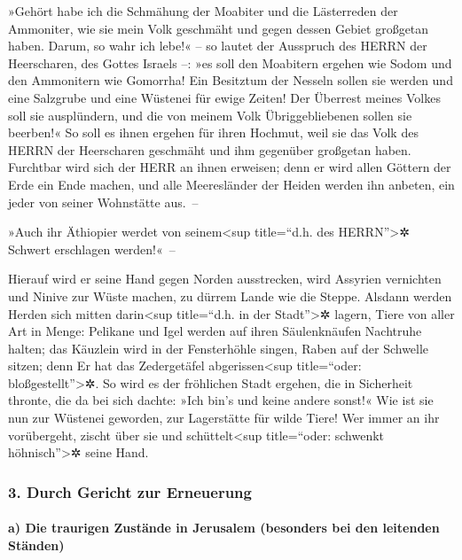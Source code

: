  »Gehört habe ich die Schmähung der Moabiter und die
Lästerreden der Ammoniter, wie sie mein Volk geschmäht und gegen dessen
Gebiet großgetan haben.  Darum, so wahr ich lebe!« -- so
lautet der Ausspruch des HERRN der Heerscharen, des Gottes Israels --:
»es soll den Moabitern ergehen wie Sodom und den Ammonitern wie
Gomorrha! Ein Besitztum der Nesseln sollen sie werden und eine Salzgrube
und eine Wüstenei für ewige Zeiten! Der Überrest meines Volkes soll sie
ausplündern, und die von meinem Volk Übriggebliebenen sollen sie
beerben!«  So soll es ihnen ergehen für ihren Hochmut,
weil sie das Volk des HERRN der Heerscharen geschmäht und ihm gegenüber
großgetan haben.  Furchtbar wird sich der HERR an ihnen
erweisen; denn er wird allen Göttern der Erde ein Ende machen, und alle
Meeresländer der Heiden werden ihn anbeten, ein jeder von seiner
Wohnstätte aus.~--

 »Auch ihr Äthiopier werdet von seinem\textless sup
title=``d.h. des HERRN''\textgreater✲ Schwert erschlagen werden!«~--

 Hierauf wird er seine Hand gegen Norden ausstrecken,
wird Assyrien vernichten und Ninive zur Wüste machen, zu dürrem Lande
wie die Steppe.  Alsdann werden Herden sich mitten
darin\textless sup title=``d.h. in der Stadt''\textgreater✲ lagern,
Tiere von aller Art in Menge: Pelikane und Igel werden auf ihren
Säulenknäufen Nachtruhe halten; das Käuzlein wird in der Fensterhöhle
singen, Raben auf der Schwelle sitzen; denn Er hat das Zedergetäfel
abgerissen\textless sup title=``oder: bloßgestellt''\textgreater✲.
 So wird es der fröhlichen Stadt ergehen, die in
Sicherheit thronte, die da bei sich dachte: »Ich bin's und keine andere
sonst!« Wie ist sie nun zur Wüstenei geworden, zur Lagerstätte für wilde
Tiere! Wer immer an ihr vorübergeht, zischt über sie und
schüttelt\textless sup title=``oder: schwenkt höhnisch''\textgreater✲
seine Hand.

\hypertarget{durch-gericht-zur-erneuerung}{%
\subsubsection{3. Durch Gericht zur
Erneuerung}\label{durch-gericht-zur-erneuerung}}

\hypertarget{a-die-traurigen-zustuxe4nde-in-jerusalem-besonders-bei-den-leitenden-stuxe4nden}{%
\paragraph{a) Die traurigen Zustände in Jerusalem (besonders bei den
leitenden
Ständen)}\label{a-die-traurigen-zustuxe4nde-in-jerusalem-besonders-bei-den-leitenden-stuxe4nden}}

